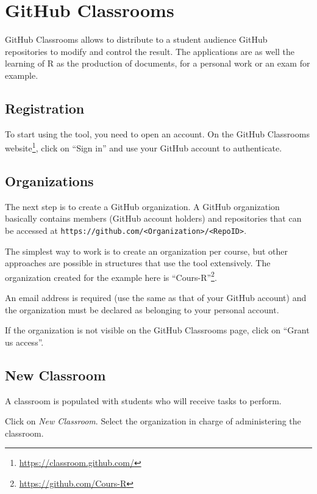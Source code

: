 \documentclass[
  12pt,
  american,
  a4paper,
  extrafontsizes,onecolumn,openright
  ]{memoir}
\newlength{\rf}
\begin{document}
\section{GitHub Classrooms}\label{github-classrooms}

GitHub Classrooms allows to distribute to a student audience GitHub repositories to modify and control the result.
The applications are as well the learning of R as the production of documents, for a personal work or an exam for example.

\subsection{Registration}\label{registration}

To start using the tool, you need to open an account.
On the GitHub Classrooms website\footnote{\url{https://classroom.github.com/}}, click on \enquote{Sign in} and use your GitHub account to authenticate.

\subsection{Organizations}\label{organizations}

The next step is to create a GitHub organization.
A GitHub organization basically contains members (GitHub account holders) and repositories that can be accessed at \texttt{https://github.com/\textless{}Organization\textgreater{}/\textless{}RepoID\textgreater{}}.

The simplest way to work is to create an organization per course, but other approaches are possible in structures that use the tool extensively.
The organization created for the example here is \enquote{Cours-R}\footnote{\url{https://github.com/Cours-R}}.

An email address is required (use the same as that of your GitHub account) and the organization must be declared as belonging to your personal account.

If the organization is not visible on the GitHub Classrooms page, click on \enquote{Grant us access}.

\subsection{New Classroom}\label{new-classroom}

A classroom is populated with students who will receive tasks to perform.

Click on \emph{New Classroom}.
Select the organization in charge of administering the classroom.
\end{document}
